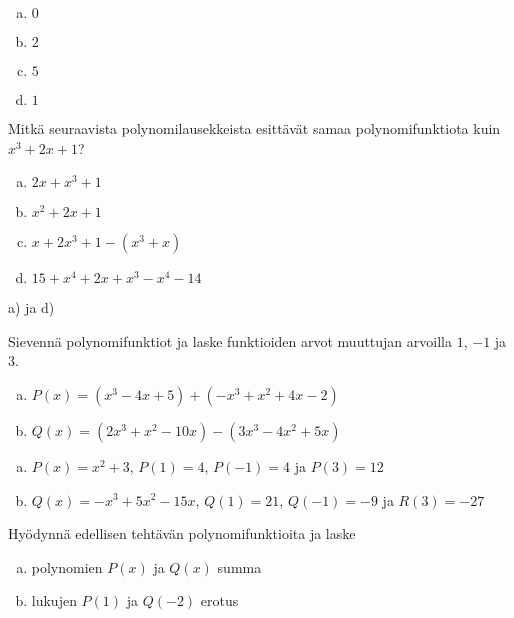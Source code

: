 \begin{tehtavasivu}
\begin{tehtava}
	\begin{vastaus}
		\begin{enumerate}[a)]
			\item $0$
			\item $2$
			\item $5$
			\item $1$
		\end{enumerate}
	\end{vastaus}
\end{tehtava}

\begin{tehtava}
	Mitkä seuraavista polynomilausekkeista esittävät samaa polynomifunktiota kuin
	$x^3+2x+1$?
	\begin{enumerate}[a)]
		\item $2x+x^3+1$
		\item $x^2+2x+1$
		\item $x+2x^3+1 - (x^3+x)$
		\item $15+x^4+2x+x^3-x^4-14$
	\end{enumerate}
	\begin{vastaus}
		a) ja d)
	\end{vastaus}
\end{tehtava}

\begin{tehtava}
	Sievennä polynomifunktiot ja laske funktioiden arvot muuttujan arvoilla $1$, $-1$ ja $3$.
	\begin{enumerate}[a)]
		\item $P(x)=(x^3-4x+5)+(-x^3+x^2+4x-2)$
		\item $Q(x)=(2x^3+x^2-10x)-(3x^3-4x^2+5x)$
	\end{enumerate}
	
	\begin{vastaus}
		\begin{enumerate}[a)]
			\item $P(x)=x^2+3$, $P(1)=4$, $P(-1)=4$ ja $P(3)=12$
			\item $Q(x)=-x^3+5x^2-15x$, $Q(1)=21$, $Q(-1)=-9$ ja $R(3)=-27$
		\end{enumerate}
	\end{vastaus}
\end{tehtava}

\begin{tehtava}
	Hyödynnä edellisen tehtävän polynomifunktioita ja laske
	\begin{enumerate}[a)]
		 \item polynomien $P(x)$ ja $Q(x)$ summa
		 \item lukujen $P(1)$ ja $Q(-2)$ erotus
	\end{enumerate}
	

\end{tehtava}
\end{tehtavasivu}
